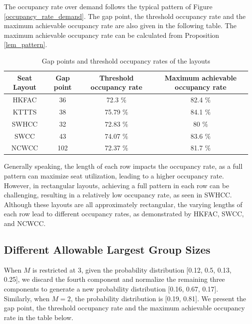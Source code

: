 The occupancy rate over demand follows the typical pattern of Figure \ref{occupancy_rate_demand}. The gap point, the threshold occupancy rate and the maximum achievable occupancy rate are also given in the following table. The maximum achievable occupancy rate can be calculated from Proposition \ref{lem_pattern}.

\begin{table}[ht]
  \centering
  \caption{Gap points and threshold occupancy rates of the layouts}
  \begin{tabular}{c|ccc}
  \hline
   Seat Layout & Gap point & Threshold occupancy rate & Maximum achievable occupancy rate \\
  \hline
   HKFAC & 36 & 72.3 \% & 82.4 \% \\
   KTTTS & 38 & 75.79 \% & 84.1 \% \\
   SWHCC & 32 & 72.83 \% & 80 \% \\
   SWCC & 43 & 74.07 \%  & 83.6 \% \\
   NCWCC & 102 & 72.37 \% & 81.7 \% \\
   \hline
  \end{tabular}
\end{table}

Generally speaking, the length of each row impacts the occupancy rate, as a full pattern can maximize seat utilization, leading to a higher occupancy rate. However, in rectangular layouts, achieving a full pattern in each row can be challenging, resulting in a relatively low occupancy rate, as seen in SWHCC. Although these layouts are all approximately rectangular, the varying lengths of each row lead to different occupancy rates, as demonstrated by HKFAC, SWCC, and NCWCC.



\subsection*{Different Allowable Largest Group Sizes}
When $M$ is restricted at 3, given the probability distribution [0.12, 0.5, 0.13, 0.25], we discard the fourth component and normalize the remaining three components to generate a new probability distribution [0.16, 0.67, 0.17]. Similarly, when $M =2$, the probability distribution is [0.19, 0.81].
We present the gap point, the threshold occupancy rate and the maximum achievable occupancy rate in the table below.


